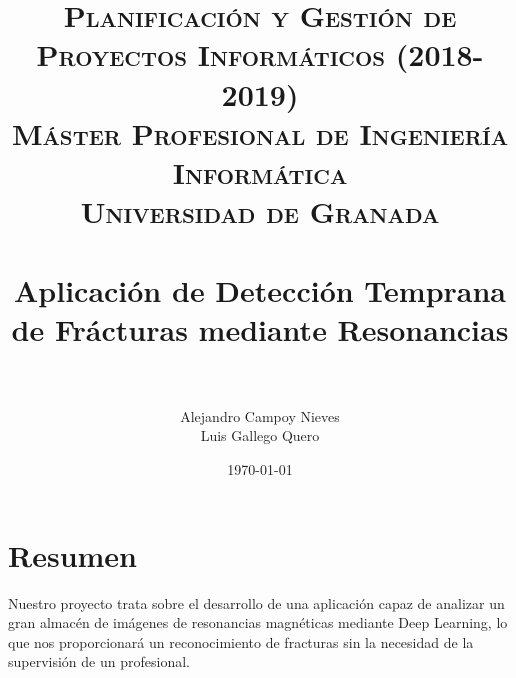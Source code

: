 


\title{	
	\normalfont \normalsize 
	\textsc{\textbf{Planificación y Gestión de Proyectos Informáticos (2018-2019)} \\ Máster Profesional de Ingeniería Informática \\ Universidad de Granada} \\ [25pt] %
	\horrule{0.5pt} \\[0.4cm] %
	\huge Aplicación de Detección Temprana de Frácturas mediante Resonancias \\ %
	\horrule{2pt} \\[0.5cm] %
}

\author{Alejandro Campoy Nieves \\ Luis Gallego Quero} %
\date{\normalsize\today} %
\usepackage{graphicx}
\usepackage{hyperref} %




\maketitle %

\newpage %

\tableofcontents %



\newpage		
 
\section{Resumen}

Nuestro proyecto trata sobre el desarrollo de una aplicación capaz de analizar un gran almacén de imágenes de resonancias magnéticas mediante Deep Learning, lo que nos proporcionará un reconocimiento de fracturas sin la necesidad de la supervisión de un profesional. \\

